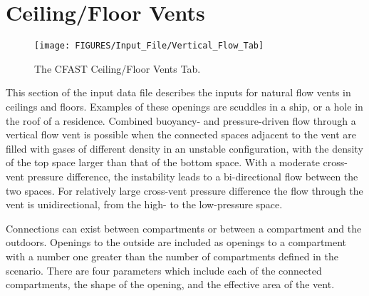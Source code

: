 
\section{Ceiling/Floor Vents}

\begin{figure}[h!]
\texttt{[image: FIGURES/Input\_File/Vertical\_Flow\_Tab]}
\caption[The CFAST Ceiling/Floor Vents Tab]{The CFAST Ceiling/Floor Vents Tab.}
\end{figure}

This section of the input data file describes the inputs for natural flow vents in ceilings and floors. Examples of these openings are scuddles in a ship, or a hole in the roof of a residence. Combined buoyancy- and pressure-driven flow through a vertical flow vent is possible when the connected spaces adjacent to the vent are filled with gases of different density in an unstable configuration, with the density of the top space larger than that of the bottom space. With a moderate cross-vent pressure difference, the instability leads to a bi-directional flow between the two spaces. For relatively large cross-vent pressure difference the flow through the vent is unidirectional, from the high- to the low-pressure space.

Connections can exist between compartments or between a compartment and the outdoors. Openings to the outside are included as openings to a compartment with a number one greater than the number of compartments defined in the scenario. There are four parameters which include each of the connected compartments, the shape of the opening, and the effective area of the vent.

